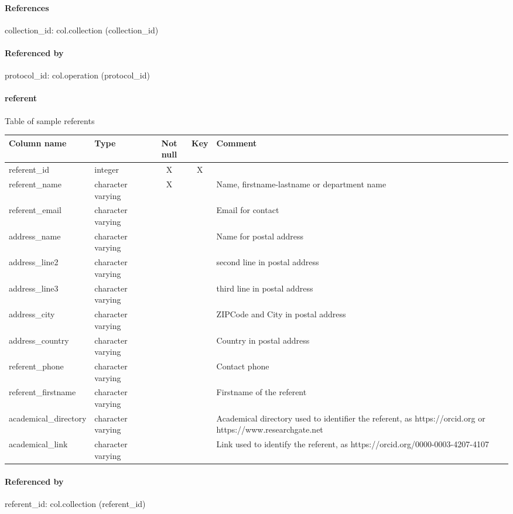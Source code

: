 \paragraph{References}
collection\_id: col.collection (collection\_id)

\paragraph{Referenced by}
protocol\_id: col.operation (protocol\_id)

\paragraph{referent}
Table of sample referents

\begin{tabular}{|l| p{2cm}|c|c| p{5cm}|}
\hline
Column name & Type & Not null & Key & Comment \\
\hline
referent\_id & integer & X & X & \\
referent\_name & character varying & X &  & Name, firstname-lastname or department name\\
referent\_email & character varying &  &  & Email for contact\\
address\_name & character varying &  &  & Name for postal address\\
address\_line2 & character varying &  &  & second line in postal address\\
address\_line3 & character varying &  &  & third line in postal address\\
address\_city & character varying &  &  & ZIPCode and City in postal address\\
address\_country & character varying &  &  & Country in postal address\\
referent\_phone & character varying &  &  & Contact phone\\
referent\_firstname & character varying &  &  & Firstname of the referent\\
academical\_directory & character varying &  &  & Academical directory used to identifier the referent, as https://orcid.org or https://www.researchgate.net\\
academical\_link & character varying &  &  & Link used to identify the referent, as https://orcid.org/0000-0003-4207-4107\\
\hline
\end{tabular}
\paragraph{Referenced by}
referent\_id: col.collection (referent\_id)

